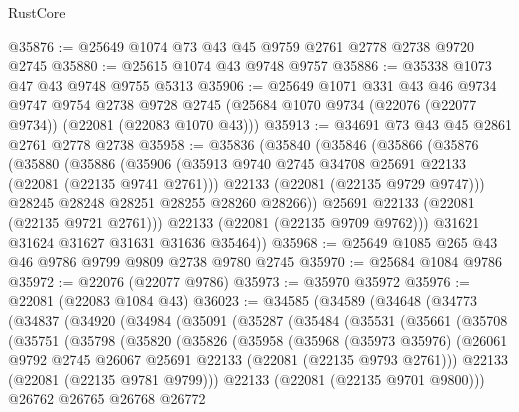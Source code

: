\begin{lexlean}{RustCore}
\begin{coremodule}
@35876 := @25649 @1074 @73 @43 @45 @9759 @2761 @2778 @2738 @9720 @2745
@35880 := @25615 @1074 @43 @9748 @9757
@35886 := @35338 @1073 @47 @43 @9748 @9755 @5313
@35906 := @25649
    @1071
    @331
    @43
    @46
    @9734
    @9747
    @9754
    @2738
    @9728
    @2745
    (@25684 @1070 @9734 (@22076 (@22077 @9734)) (@22081 (@22083 @1070 @43)))
@35913 := @34691 @73 @43 @45 @2861 @2761 @2778 @2738
@35958 := @35836
    (@35840
      (@35846
        (@35866
          (@35876
            (@35880
              (@35886
                (@35906
                  (@35913 @9740 @2745 @34708 @25691 @22133 (@22081 (@22135 @9741 @2761)))
                  @22133
                  (@22081 (@22135 @9729 @9747)))
                @28245
                @28248
                @28251
                @28255
                @28260
                @28266))
            @25691
            @22133
            (@22081 (@22135 @9721 @2761)))
          @22133
          (@22081 (@22135 @9709 @9762)))
        @31621
        @31624
        @31627
        @31631
        @31636
        @35464))
@35968 := @25649 @1085 @265 @43 @46 @9786 @9799 @9809 @2738 @9780 @2745
@35970 := @25684 @1084 @9786
@35972 := @22076 (@22077 @9786)
@35973 := @35970 @35972
@35976 := @22081 (@22083 @1084 @43)
@36023 := @34585
    (@34589
      (@34648
        (@34773
          (@34837
            (@34920
              (@34984
                (@35091
                  (@35287
                    (@35484
                      (@35531
                        (@35661
                          (@35708
                            (@35751
                              (@35798
                                (@35820
                                  (@35826
                                    (@35958
                                      (@35968
                                        (@35973 @35976)
                                        (@26061
                                          @9792
                                          @2745
                                          @26067
                                          @25691
                                          @22133
                                          (@22081 (@22135 @9793 @2761)))
                                        @22133
                                        (@22081 (@22135 @9781 @9799)))
                                      @22133
                                      (@22081 (@22135 @9701 @9800)))
                                    @26762
                                    @26765
                                    @26768
                                    @26772

\end{coremodule}
\end{lexlean}
